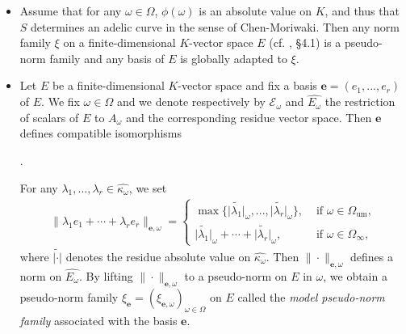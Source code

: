 \documentclass [11pt,reqno]{amsart}
\newcommand{\1}{\mathmybb{1}}
\def\cE{{\mathcal{E}}}
\def\um{\operatorname{um}}
\def\tilde{\widetilde}
\begin{document}
\begin{example}
\label{example:model_semi-norm_family}
\begin{itemize}
	\item[(1)] Assume that for any $\omega\in\Omega$, $\phi(\omega)$ is an absolute value on $K$, and thus that $S$ determines an adelic curve in the sense of Chen-Moriwaki. Then any norm family $\xi$ on a finite-dimensional $K$-vector space $E$ (cf. \cite{ChenMori}, \S 4.1) is a pseudo-norm family and any basis of $E$ is globally adapted to $\xi$.
	\item[(2)] Let $E$ be a finite-dimensional $K$-vector space and fix a basis $\mathbf{e}=(e_1,...,e_r)$ of $E$. We fix $\omega \in \Omega$ and we denote respectively by $\cE_{\omega}$ and $\widehat{E_{\omega}}$ the restriction of scalars of $E$ to $A_{\omega}$ and the corresponding residue vector space. Then $\mathbf{e}$ defines compatible isomorphisms
\begin{center}
.
\end{center}
For any $\lambda_1,...,\lambda_r \in \widehat{\kappa_{\omega}}$, we set
\begin{align*}
\|\lambda_{1} e_{1}+\cdots+\lambda_{r} e_{r}\|_{\mathbf{e},\omega}=\left\{\begin{matrix}
\max\{\tilde{|\lambda_{1}|}_\omega,...,\tilde{|\lambda_{r}|}_\omega\}, &\text{ if } \omega \in \Omega_{\um},\\ 
\tilde{|\lambda_{1}|}_\omega+\cdots + \tilde{|\lambda_{r}|}_\omega, &\text{ if } \omega \in \Omega_{\infty},
\end{matrix}\right.
\end{align*}
where $\tilde{|\cdot|}$ denotes the residue absolute value on $\widehat{\kappa_{\omega}}$. Then $\|\cdot\|_{\mathbf{e},\omega}$ defines a norm on $\widehat{E_{\omega}}$. By lifting $\|\cdot\|_{\mathbf{e},\omega}$ to a pseudo-norm on $E$ in $\omega$, we obtain a pseudo-norm family $\xi_{\mathbf{e}}=(\xi_{\mathbf{e},\omega})_{\omega\in\Omega}$ on $E$ called the \emph{model pseudo-norm family} associated with the basis $\mathbf{e}$. 


\end{itemize}
\end{example}
\end{document}
